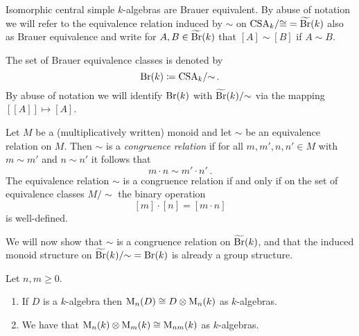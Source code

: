 \begin{remark}
  Isomorphic central simple $k$-algebras are Brauer equivalent.
  By abuse of notation we will refer to the equivalence relation induced by $\sim$ on $\operatorname{CSA}_k\!/{\cong} = \widetilde{\operatorname{Br}}(k)$ also as Brauer equivalence and write for $A, B \in \widetilde{\operatorname{Br}}(k)$ that $[A] \sim [B]$ if $A \sim B$.
\end{remark}


\begin{notation}
  The set of Brauer equivalence classes is denoted by
  \[
              \operatorname{Br}(k)
    \coloneqq  \operatorname{CSA}_k\!/{\sim} \,.
  \]
  By abuse of notation we will identify $\operatorname{Br}(k)$ with $\widetilde{\operatorname{Br}}(k)/{\sim}$ via the mapping $[[A]] \mapsto [A]$.
\end{notation}


\begin{recall}
  Let $M$ be a (multiplicatively written) monoid and let $\sim$ be an equivalence relation on $M$.
  Then $\sim$ is a \emph{congruence relation} if for all $m, m', n, n' \in M$ with $m \sim m'$ and $n \sim n'$ it follows that
  \[
    m \cdot n \sim m' \cdot n' \,.
  \]
  The equivalence relation $\sim$ is a congruence relation if and only if on the set of equivalence classes $M/{\sim}$ the binary operation
  \[
      [m] \cdot [n]
    = [m \cdot n]
  \]
  is well-defined.
\end{recall}


\begin{fluff}
  We will now show that $\sim$ is a congruence relation on $\widetilde{\operatorname{Br}}(k)$, and that the induced monoid structure on $\widetilde{\operatorname{Br}}(k)/{\sim} = \operatorname{Br}(k)$ is already a group structure.
\end{fluff}


\begin{lemma}
  Let $n, m \geq 0$.
  \begin{enumerate}
    \item
      If $D$ is a $k$-algebra then $\operatorname{M}_n(D) \cong D \mathbin{\otimes} \operatorname{M}_n(k)$ as $k$-algebras.
    \item
      We have that $\operatorname{M}_n(k) \mathbin{\otimes} \operatorname{M}_m(k) \cong \operatorname{M}_{nm}(k)$ as $k$-algebras.
  \end{enumerate}
\end{lemma}


